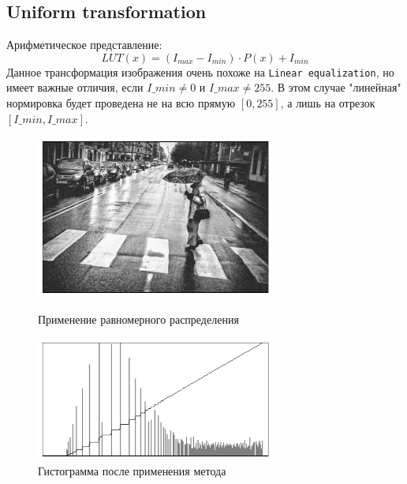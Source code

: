 \documentclass[a4paper,12pt]{article}
\begin{document}
\subsection{Uniform transformation}
Арифметическое представление:
$$LUT(x) = (I_{max} - I_{min}) \cdot P(x) + I_{min}$$
Данное трансформация изображения очень похоже на \texttt{Linear equalization}, но имеет важные отличия, если $I\_min \neq 0$  и  $I\_max \neq 255$. В этом случае "линейная" нормировка будет проведена не на всю прямую $[0,255]$, а лишь на отрезок $[I\_min, I\_max]$.
\begin{figure}[H]
    \centering \includegraphics[width=0.7\textwidth]{images/uniform.png}
    \caption{Применение равномерного распределения}
    \centering \includegraphics[width=0.7\textwidth]{images/uniform_hist.png}
    \caption{Гистограмма после применения метода}
\end{figure}
\end{document}
